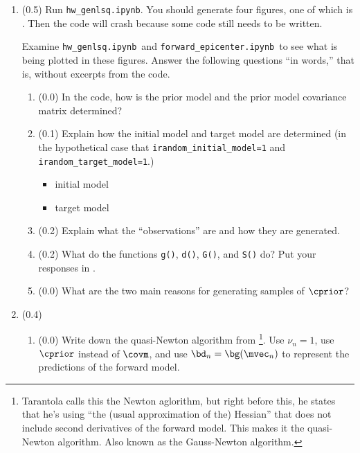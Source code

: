 \documentclass[11pt,titlepage,fleqn]{article}
\newcommand{\tfile}{{\tt hw\_genlsq.ipynb}}
\newcommand{\tfileFE}{{\tt forward\_epicenter.ipynb}}
\begin{document}
\begin{enumerate}
\item (0.5)
Run \tfile.
You should generate four figures, one of which is . Then the code will crash because some code still needs to be written.

Examine \tfile\ and \tfileFE\ to see what is being plotted in these figures. Answer the following questions ``in words,'' that is, without excerpts from the code.

\begin{enumerate}
\item (0.0) In the code, how is the prior model and the prior model covariance matrix determined?

\vspace{1cm}

\item (0.1) Explain how the initial model and target model are determined (in the hypothetical case that \verb+irandom_initial_model=1+ and \verb+irandom_target_model=1+.)

\begin{itemize}
\item initial model
\item target model
\end{itemize}

\item (0.2) Explain what the ``observations'' are and how they are generated.

\vspace{1cm}

\item (0.2) What do the functions \verb+g()+, \verb+d()+, \verb+G()+, and \verb+S()+ do? Put your responses in .

\item (0.0) What are the two main reasons for generating samples of $\cprior$?

\vspace{1cm}

\end{enumerate}



\item (0.4) 

\begin{enumerate}
\item (0.0) Write down the quasi-Newton algorithm from \citet[][Eq.~6.319]{Tarantola2005}\footnote{Tarantola calls this the Newton aglorithm, but right before this, he states that he's using ``the (usual approximation of the) Hessian'' that does not include second derivatives of the forward model. This makes it the quasi-Newton algorithm. Also known as the Gauss-Newton algorithm.}. Use $\nu_n = 1$, use $\cprior$ instead of $\covm$, and use $\bd_n = \bg(\mvec_n)$ to represent the predictions of the forward model.


\end{enumerate}
\end{enumerate}
\end{document}
